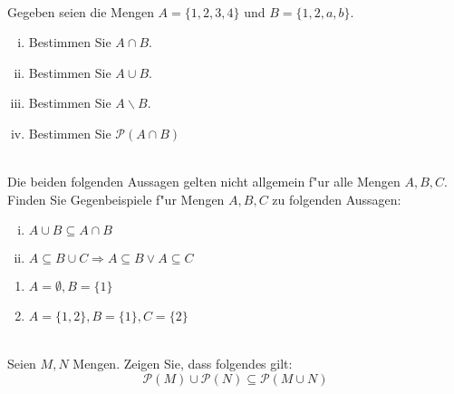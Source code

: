 \newcommand{\printpraesenzlsg}{false}
\newcommand{\printloesungen}{false}
\newcommand{\printbewertungen}{false}
\newcommand{\blattnummer}{1}




\iforiginal{}
\\
Gegeben seien die Mengen $A=\{1,2,3,4\}$ und $B=\{1,2,a,b\}$.
\begin{enumerate}[(i)]
    \item Bestimmen Sie $A\cap B$.
    \item Bestimmen Sie $A\cup B$.
    \item Bestimmen Sie $A\backslash B$.
    \item Bestimmen Sie $\mathscr{P}(A\cap B)$
    
\end{enumerate}

\\
Die beiden folgenden Aussagen gelten nicht allgemein f"ur alle Mengen $A,B,C$. Finden Sie Gegenbeispiele f"ur Mengen $A,B,C$ zu folgenden Aussagen:
\begin{enumerate}[(i)]
\item $A\cup B\subseteq A\cap B$
\item $A\subseteq B\cup C\Rightarrow A\subseteq B\vee A\subseteq C$
\end{enumerate}

\begin{loesung}
\begin{enumerate}
\item $A=\emptyset, B=\{1\}$
\item $A=\{1,2\},B=\{1\}, C=\{2\}$
\end{enumerate}
\end{loesung}

\\
Seien $M,N$ Mengen. Zeigen Sie, dass folgendes gilt:
\[\mathscr{P}(M)\cup\mathscr{P}(N)\subseteq \mathscr{P}(M\cup N)\]


